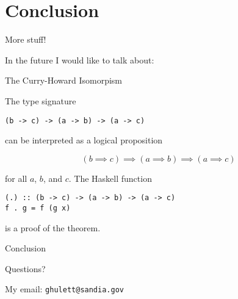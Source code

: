 
\section{Conclusion}

%
\begin{frame}{More stuff!}

In the future I would like to talk about:

\end{frame}

%
\begin{frame}[fragile]{The Curry-Howard Isomorpism}

The type signature

\begin{block}{}
\begin{verbatim}
(b -> c) -> (a -> b) -> (a -> c)
\end{verbatim}
\end{block}

can be interpreted as a logical proposition

\begin{block}{}
\[
(b \implies c) \implies (a \implies b) \implies (a \implies c)
\]
\end{block}

for all $a$, $b$, and $c$. The Haskell function

\begin{block}{}
\begin{verbatim}
(.) :: (b -> c) -> (a -> b) -> (a -> c)
f . g = f (g x)
\end{verbatim}
\end{block}

is a proof of the theorem.

\end{frame}

%
\begin{frame}{Conclusion}

Questions?

My email: \texttt{ghulett@sandia.gov}

\end{frame}
